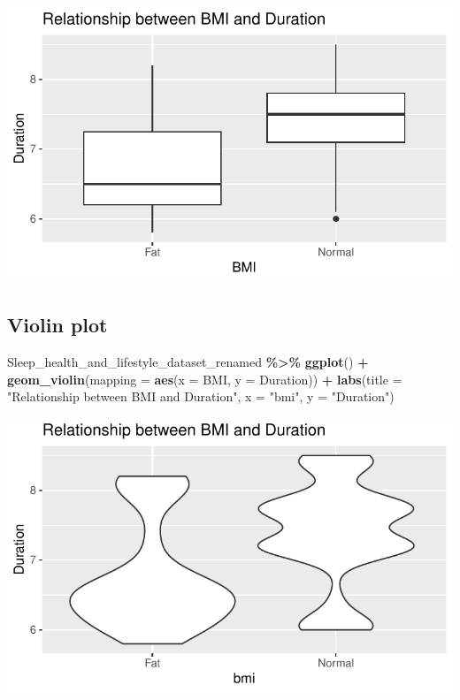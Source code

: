 \documentclass[
  11pt,
]{article}
\newenvironment{Shaded}{\begin{snugshade}}{\end{snugshade}}
\newcommand{\AttributeTok}[1]{\textcolor[rgb]{0.13,0.29,0.53}{#1}}
\newcommand{\FunctionTok}[1]{\textcolor[rgb]{0.13,0.29,0.53}{\textbf{#1}}}
\newcommand{\NormalTok}[1]{#1}
\newcommand{\SpecialCharTok}[1]{\textcolor[rgb]{0.81,0.36,0.00}{\textbf{#1}}}
\newcommand{\StringTok}[1]{\textcolor[rgb]{0.31,0.60,0.02}{#1}}
\begin{document}
\begin{center}\includegraphics[width=0.7\linewidth]{SleepHelath_files/figure-latex/unnamed-chunk-21-1} \end{center}

\hypertarget{violin-plot-1}{%
\subsection{Violin plot}\label{violin-plot-1}}

\begin{Shaded}
\begin{Highlighting}[]
\NormalTok{Sleep\_health\_and\_lifestyle\_dataset\_renamed }\SpecialCharTok{\%\textgreater{}\%}
  \FunctionTok{ggplot}\NormalTok{() }\SpecialCharTok{+}
    \FunctionTok{geom\_violin}\NormalTok{(}\AttributeTok{mapping =} \FunctionTok{aes}\NormalTok{(}\AttributeTok{x =}\NormalTok{ BMI, }\AttributeTok{y =}\NormalTok{ Duration)) }\SpecialCharTok{+}
    \FunctionTok{labs}\NormalTok{(}\AttributeTok{title =} \StringTok{"Relationship between BMI and Duration"}\NormalTok{, }\AttributeTok{x =} \StringTok{"bmi"}\NormalTok{, }\AttributeTok{y =} \StringTok{"Duration"}\NormalTok{)}
\end{Highlighting}
\end{Shaded}

\begin{center}\includegraphics[width=0.7\linewidth]{SleepHelath_files/figure-latex/unnamed-chunk-22-1} \end{center}
\end{document}
